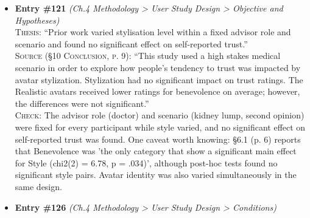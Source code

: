 \documentclass[11pt, a4paper]{article}
\begin{document}
\begin{itemize}[leftmargin=1.2em,itemsep=4pt]
\textsc{Thesis:} ``It compared coarse style categories rather than a specific NPR shader pipeline and did not measure eeriness as a dimension separate from overall stylisation.''\\
\textsc{Source (§4.1 Avatars, p. 4; §5.3 Procedure, p. 5):} ``The two stylized versions of each identity were hand modeled by a team of artists. ... they created concept art for a caricatured version of each person along with a semi-realistic model intended to lie between the caricature and realistic model. ... [§5.3, p. 5] Prompts were customized from [23] and designed to measure Ability, Benevolence and Integrity, the three constituents of the trust model used in this study, and then a composite measure of Trust.''\\
\textsc{Check:} Both halves hold. Stylisation was a coarse three-level artist-authored sculpt and texture manipulation, not a shader pipeline. The post-doctor survey instrument (Supplemental §11.1) contains only Ability, Benevolence, Integrity and Trust items, with no eeriness or uncanniness scale; eeriness appears only as unprompted remarks in the structured interviews ('only four describing them as uncanny or creepy', §7, p. 7).
\item \textbf{Entry \#121} \textit{(Ch.4 Methodology > User Study Design > Objective and Hypotheses)}\\
\textsc{Thesis:} ``Prior work varied stylisation level within a fixed advisor role and scenario and found no significant effect on self-reported trust.''\\
\textsc{Source (§10 Conclusion, p. 9):} ``This study used a high stakes medical scenario in order to explore how people's tendency to trust was impacted by avatar stylization. Stylization had no significant impact on trust ratings. The Realistic avatars received lower ratings for benevolence on average; however, the differences were not significant.''\\
\textsc{Check:} The advisor role (doctor) and scenario (kidney lump, second opinion) were fixed for every participant while style varied, and no significant effect on self-reported trust was found. One caveat worth knowing: §6.1 (p. 6) reports that Benevolence was 'the only category that show a significant main effect for Style (chi2(2) = 6.78, p = .034)', although post-hoc tests found no significant style pairs. Avatar identity was also varied simultaneously in the same design.
\item \textbf{Entry \#126} \textit{(Ch.4 Methodology > User Study Design > Conditions)}\\

\end{itemize}
\end{document}
